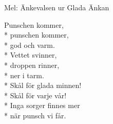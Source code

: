 \begin{SongText}
    \begin{SongInfo}
        Mel: Änkevalsen ur Glada Änkan
    \end{SongInfo}
    \begin{SongVerse}
        Punschen kommer,\\*%
        punschen kommer,\\*%
        god och varm.\\*%
        Vettet svinner,\\*%
        droppen rinner,\\*%
        ner i tarm.\\*%
        Skål för glada minnen!\\*%
        Skål för varje vår!\\*%
        Inga sorger finnes mer\\*%
        när punsch vi får.
    \end{SongVerse}
\end{SongText}